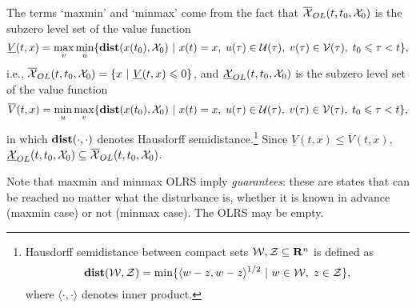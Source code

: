 The terms `maxmin' and `minmax' come from the fact that
$\OXOL(t, t_0, \XX_0)$ is the subzero level set of the value function
\begin{equation}
\underline{V}(t, x) =
\max_v\min_u\{{\bf dist}(x(t_0), \XX_0) ~|~ x(t)=x, \; u(\tau)\in\UU(\tau), \;
v(\tau)\in\VV(\tau), \; t_0\leq\tau<t\},
\label{maxminvf}
\end{equation}
i.e., $\OXOL(t, t_0, \XX_0) = \{ x~|~\underline{V}(t, x) \le 0\}$,
and $\UXOL(t, t_0, \XX_0)$ is the subzero level set of the value function
\begin{equation}
\overline{V}(t, x) =
\min_u\max_v\{{\bf dist}(x(t_0), \XX_0) ~|~ x(t)=x, \; u(\tau)\in\UU(\tau), \;
v(\tau)\in\VV(\tau), \; t_0\leq\tau<t\},
\label{minmaxvf}
\end{equation}
in which ${\bf dist}(\cdot, \cdot)$ denotes Hausdorff
semidistance.\footnote{Hausdorff semidistance between compact sets
$\WW, \ZZ \subseteq {\bf R}^n$ is defined as
\[ {\bf dist}(\WW, \ZZ) = \min\{\langle w-z, w-z\rangle^{1/2}
~|~ w\in\WW, \; z\in\ZZ\}, \]
where $\langle\cdot, \cdot\rangle$ denotes inner product.}
Since $\underline{V}(t, x)\leq\overline{V}(t, x)$,
$\UXOL(t, t_0, \XX_0)\subseteq\OXOL(t, t_0, \XX_0)$.

Note that maxmin and minmax OLRS imply \emph{guarantees}: these are states that can be reached
no matter what the disturbance is, whether it is known in advance
(maxmin case) or not (minmax case).
The OLRS may be empty.


